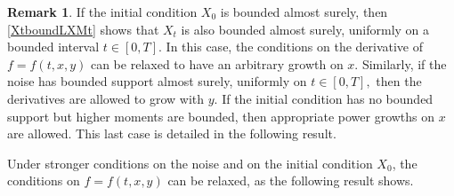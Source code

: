 \documentclass[reqno,12pt]{amsart}
\theoremstyle{plain} %
\theoremstyle{definition} %
\newtheorem{remark}{Remark}[section]
\begin{document}
\begin{remark}
    If the initial condition $X_0$ is bounded almost surely, then \eqref{XtboundLXMt} shows that $X_t$ is also bounded almost surely, uniformly on a bounded interval $t\in [0, T].$ In this case, the conditions on the derivative of $f=f(t, x, y)$ can be relaxed to have an arbitrary growth on $x$. Similarly, if the noise has bounded support almost surely, uniformly on $t\in [0, T],$ then the derivatives are allowed to grow with $y$. If the initial condition has no bounded support but higher moments are bounded, then appropriate power growths on $x$ are allowed. This last case is detailed in the following result.
\end{remark}

Under stronger conditions on the noise and on the initial condition $X_0$, the conditions on $f=f(t, x, y)$ can be relaxed, as the following result shows.
\end{document}
